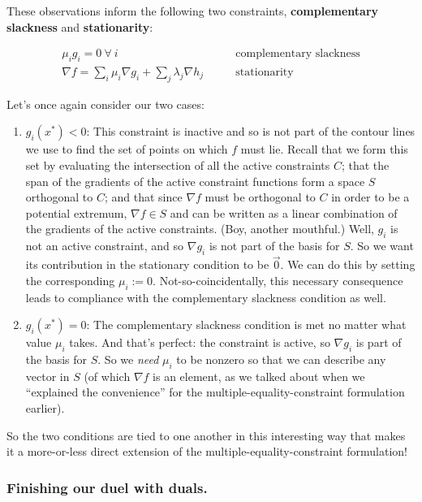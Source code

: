 \documentclass[letterpaper,12pt]{report}
\providecommand{\tightlist}{%
  \setlength{\itemsep}{0pt}\setlength{\parskip}{0pt}}
\begin{document}
These observations inform the following two constraints,
\textbf{complementary slackness} and \textbf{stationarity}:

\[\begin{split} \mu_i g_i = 0 \ \forall \ i \qquad & \text{complementary slackness} \\
\nabla f = \sum _i \mu _i \nabla g_i + \sum _j \lambda _j \nabla h_j \qquad & \text{stationarity} \end{split}\]

Let's once again consider our two cases:

\begin{enumerate}
\item
  \(g_i(x^*) < 0\): This constraint is inactive and so is not part of
  the contour lines we use to find the set of points on which \(f\) must
  lie. Recall that we form this set by evaluating the intersection of
  all the active constraints \(C\); that the span of the gradients of
  the active constraint functions form a space \(S\) orthogonal to
  \(C\); and that since \(\nabla f\) must be orthogonal to \(C\) in
  order to be a potential extremum, \(\nabla f \in S\) and can be
  written as a linear combination of the gradients of the active
  constraints. (Boy, another mouthful.) Well, \(g_i\) is not an active
  constraint, and so \(\nabla g_i\) is not part of the basis for \(S\).
  So we want its contribution in the stationary condition to be
  \(\vec{0}\). We can do this by setting the corresponding
  \(\mu_i := 0\). Not-so-coincidentally, this necessary consequence
  leads to compliance with the complementary slackness condition as
  well.
\item
  \(g_i(x^*) = 0\): The complementary slackness condition is met no
  matter what value \(\mu_i\) takes. And that's perfect: the constraint
  is active, so \(\nabla g_i\) is part of the basis for \(S\). So we
  \emph{need} \(\mu_i\) to be nonzero so that we can describe any vector
  in \(S\) (of which \(\nabla f\) is an element, as we talked about when
  we ``explained the convenience'' for the multiple-equality-constraint
  formulation earlier).
\end{enumerate}

So the two conditions are tied to one another in this interesting way
that makes it a more-or-less direct extension of the
multiple-equality-constraint formulation!

\subsubsection{Finishing our duel with
duals.}\label{finishing-our-duel-with-duals.}
\end{document}
